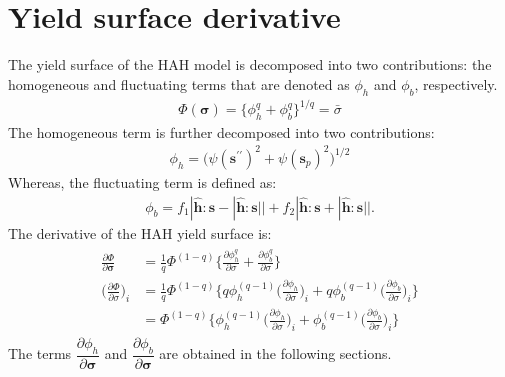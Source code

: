 \documentclass[12pt]{amsart}
\begin{document}
\section{Yield surface derivative}
The yield surface of the HAH model is decomposed into two contributions: the homogeneous and fluctuating terms that are denoted as $\phi_h$ and $\phi_b$, respectively.
\begin{eqnarray}
  \label{eq:hah_def}
  \Phi(\mathbf{\sigma})=\{\phi_h^q + \phi_b^q \}^{1/q}=\bar{\sigma}
\end{eqnarray}
The homogeneous term is further decomposed into two contributions:
\begin{eqnarray}
  \label{eq:hah_homo}
  \phi_h = \big(\psi(\mathbf{s}^{\prime\prime})^2+\psi(\mathbf{s}_p)^2\big)^{1/2}
\end{eqnarray}
Whereas, the fluctuating term is defined as:
\begin{eqnarray}
    \label{eq:fluc}
\phi_b  = f_1|\hat{\mathbf{h}}:\mathbf{s} - |\hat{\mathbf{h}}:\mathbf{s}||    + f_2|\hat{\mathbf{h}}:\mathbf{s} + |\hat{\mathbf{h}}:\mathbf{s}||.
\end{eqnarray}
The derivative of the HAH yield surface is:
\begin{eqnarray}
  \begin{split}
  \label{eq:hah_deriv}
  \frac{\partial\Phi}{\partial\mathbf{\sigma}} &=\frac{1}{q}\Phi^{(1-q)} \bigg\{                  \frac{\partial{\phi_h^q}}{\partial{\sigma}}  +                 \frac{\partial{\phi_b^q}}{\partial{\sigma}}         \bigg\}\\
  \bigg(\frac{\partial\Phi}{\partial\sigma}\bigg)_i&=\frac{1}{q}\Phi^{(1-q)} \bigg\{  q \phi_h^{(q-1)}\Big(\frac{\partial{\phi_h}  }{\partial{\sigma}}\Big)_i  + q \phi_b^{(q-1)} \Big(\frac{\partial{\phi_b}  }{ \partial\sigma}\Big)_i         \bigg\}\\
                                                      &=\Phi^{(1-q)} \bigg\{    \phi_h^{(q-1)}\Big(\frac{\partial{\phi_h}  }{\partial{\sigma}}\Big)_i  + \phi_b^{(q-1)} \Big(\frac{\partial{\phi_b}  }{ \partial\sigma}\Big)_i         \bigg\}
  \end{split}
\end{eqnarray}
The terms $\dfrac{\partial\phi_h}{\partial\mathbf{\sigma}}$ and $\dfrac{\partial\phi_b}{\partial\mathbf{\sigma}}$ are obtained in the following sections.
\end{document}
